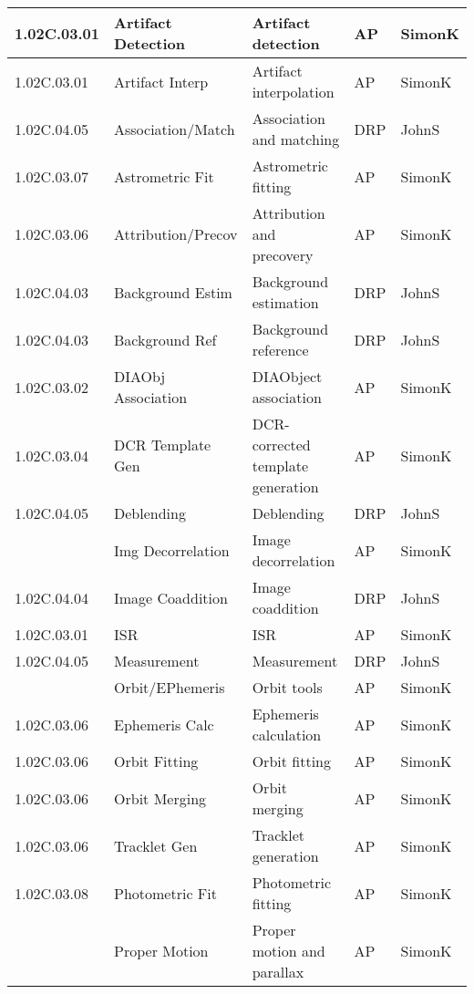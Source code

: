 \begin{longtable}{|p{}|p{}|p{}|p{}|p{}|}
{\tiny 1.02C.03.01} & \small Artifact Detection & Artifact detection & AP & SimonK\\ \hline 
{\tiny 1.02C.03.01} & \small Artifact Interp & Artifact interpolation & AP & SimonK\\ \hline 
{\tiny 1.02C.04.05} & \small Association/Match & Association and matching & DRP & JohnS\\ \hline 
{\tiny 1.02C.03.07} & \small Astrometric Fit & Astrometric fitting & AP & SimonK\\ \hline 
{\tiny 1.02C.03.06} & \small Attribution/Precov & Attribution and precovery & AP & SimonK\\ \hline 
{\tiny 1.02C.04.03} & \small Background Estim & Background estimation & DRP & JohnS\\ \hline 
{\tiny 1.02C.04.03} & \small Background Ref & Background reference & DRP & JohnS\\ \hline 
{\tiny 1.02C.03.02} & \small DIAObj Association & DIAObject association & AP & SimonK\\ \hline 
{\tiny 1.02C.03.04} & \small DCR Template Gen & DCR-corrected template generation & AP & SimonK\\ \hline 
{\tiny 1.02C.04.05} & \small Deblending & Deblending & DRP & JohnS\\ \hline 
{\tiny } & \small Img Decorrelation & Image decorrelation & AP & SimonK\\ \hline 
{\tiny 1.02C.04.04} & \small Image Coaddition & Image coaddition & DRP & JohnS\\ \hline 
{\tiny 1.02C.03.01} & \small ISR & ISR & AP & SimonK\\ \hline 
{\tiny 1.02C.04.05} & \small Measurement & Measurement & DRP & JohnS\\ \hline 
{\tiny } & \small Orbit/EPhemeris & Orbit tools & AP & SimonK\\ \hline 
{\tiny 1.02C.03.06} & \small Ephemeris Calc & Ephemeris calculation & AP & SimonK\\ \hline 
{\tiny 1.02C.03.06} & \small Orbit Fitting & Orbit fitting & AP & SimonK\\ \hline 
{\tiny 1.02C.03.06} & \small Orbit Merging & Orbit merging & AP & SimonK\\ \hline 
{\tiny 1.02C.03.06} & \small Tracklet Gen & Tracklet generation & AP & SimonK\\ \hline 
{\tiny 1.02C.03.08} & \small Photometric Fit & Photometric fitting & AP & SimonK\\ \hline 
{\tiny } & \small Proper Motion & Proper motion and parallax & AP & SimonK\\ \hline 

\end{longtable}
